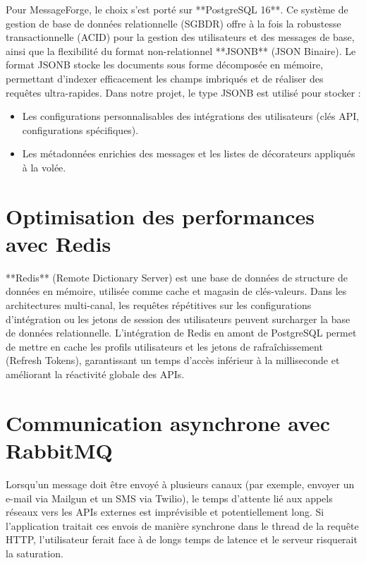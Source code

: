 Pour MessageForge, le choix s'est porté sur **PostgreSQL 16**. Ce système de gestion de base de données relationnelle (SGBDR) offre à la fois la robustesse transactionnelle (ACID) pour la gestion des utilisateurs et des messages de base, ainsi que la flexibilité du format non-relationnel **JSONB** (JSON Binaire).
Le format JSONB stocke les documents sous forme décomposée en mémoire, permettant d'indexer efficacement les champs imbriqués et de réaliser des requêtes ultra-rapides. Dans notre projet, le type JSONB est utilisé pour stocker :
\begin{itemize}
    \item Les configurations personnalisables des intégrations des utilisateurs (clés API, configurations spécifiques).
    \item Les métadonnées enrichies des messages et les listes de décorateurs appliqués à la volée.
\end{itemize}

\section{Optimisation des performances avec Redis}

**Redis** (Remote Dictionary Server) est une base de données de structure de données en mémoire, utilisée comme cache et magasin de clés-valeurs. 
Dans les architectures multi-canal, les requêtes répétitives sur les configurations d'intégration ou les jetons de session des utilisateurs peuvent surcharger la base de données relationnelle. L'intégration de Redis en amont de PostgreSQL permet de mettre en cache les profils utilisateurs et les jetons de rafraîchissement (Refresh Tokens), garantissant un temps d'accès inférieur à la milliseconde et améliorant la réactivité globale des APIs.

\section{Communication asynchrone avec RabbitMQ}

Lorsqu'un message doit être envoyé à plusieurs canaux (par exemple, envoyer un e-mail via Mailgun et un SMS via Twilio), le temps d'attente lié aux appels réseaux vers les APIs externes est imprévisible et potentiellement long. Si l'application traitait ces envois de manière synchrone dans le thread de la requête HTTP, l'utilisateur ferait face à de longs temps de latence et le serveur risquerait la saturation.

